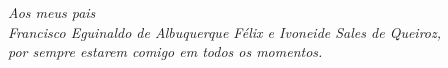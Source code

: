 \begin{dedicatoria}
    \vspace*{\fill}
    \begin{flushright}
        \textit{ Aos meus pais \\
        Francisco Eguinaldo de Albuquerque Félix e Ivoneide Sales de Queiroz, \\ 
        por sempre estarem comigo em todos os momentos.}
   	\end{flushright}
\end{dedicatoria}

